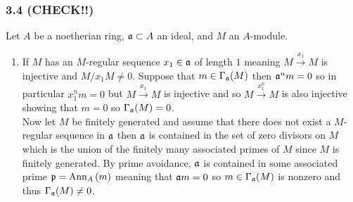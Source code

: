 \documentclass[12pt]{article}
\begin{document}
\subsubsection{3.4 (CHECK!!)}

Let $A$ be a noetherian ring, $\mathfrak{a} \subset A$ an ideal, and $M$ an $A$-module. 

\begin{enumerate}
\item 
If $M$ has an $M$-regular sequence $x_1 \in \mathfrak{a}$ of length $1$ meaning $M \xrightarrow{x_1} M$ is injective and $M / x_1 M \neq 0$. Suppose that $m \in \Gamma_{\mathfrak{a}}(M)$ then $\mathfrak{a}^n m = 0$ so in particular $x_1^n m = 0$ but $M \xrightarrow{x_1} M$ is injective and so $M \xrightarrow{x_1^n} M$ is also injective showing that $m = 0$ so $\Gamma_{\mathfrak{a}}(M) = 0$. 
\bigskip\\
Now let $M$ be finitely generated and assume that there does not exist a $M$-regular sequence in $\mathfrak{a}$ then $\mathfrak{a}$ is contained in the set of zero divisors on $M$ which is the union of the finitely many associated primes of $M$ since $M$ is finitely generated. By prime avoidance, $\mathfrak{a}$ is contained in some associated prime $\mathfrak{p} = \mathrm{Ann}_{A}\left(m\right)$ meaning that $\mathfrak{a} m = 0$ so $m \in \Gamma_{\mathfrak{a}}(M)$ is nonzero and thus $\Gamma_{\mathfrak{a}}(M) \neq 0$.


\end{enumerate}
\end{document}
